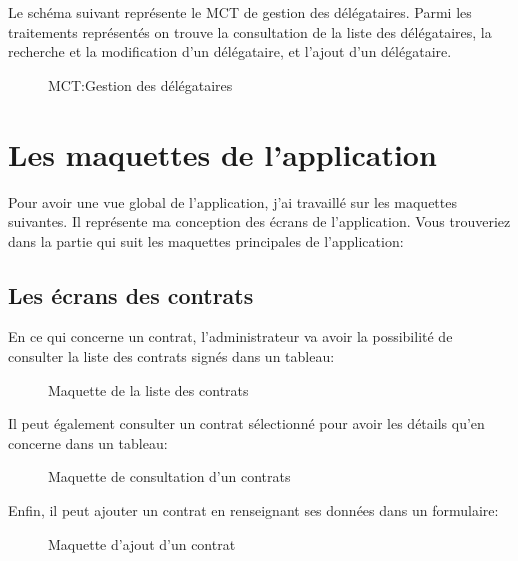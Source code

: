 	Le schéma suivant représente le MCT de gestion des délégataires. Parmi les traitements représentés
	on trouve la consultation de la liste des délégataires, la recherche et la modification d'un délégataire,
	et l'ajout d'un délégataire.
	\begin{figure}[H]
		\begin{center}
			\caption{MCT:Gestion des délégataires}
		\end{center}
	\end{figure}

	\section{Les maquettes de l'application}

	Pour avoir une vue global de l'application, j'ai travaillé sur les maquettes suivantes. Il représente ma
	conception des écrans de l'application. Vous trouveriez dans la partie qui suit les maquettes principales
	de l'application:

	\subsection{Les écrans des contrats}

	En ce qui concerne un contrat, l'administrateur va avoir la possibilité de consulter la liste des contrats signés dans un tableau:
	\begin{figure}[H]
		\begin{center}
			\caption{Maquette de la liste des contrats}
		\end{center}
	\end{figure}

	Il peut également consulter un contrat sélectionné pour avoir les détails qu’en concerne dans un tableau:
	\begin{figure}[H]
		\begin{center}
			\caption{Maquette de consultation d'un contrats}
		\end{center}
	\end{figure}

	Enfin, il peut ajouter un contrat en renseignant ses données dans un formulaire:
	\begin{figure}[H]
		\begin{center}
			\caption{Maquette d'ajout d'un contrat}
		\end{center}
	\end{figure}

